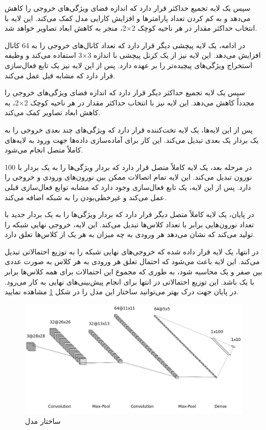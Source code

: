 سپس یک لایه تجمیع حداکثر%
قرار دارد که اندازه فضای ویژگی‌های خروجی را کاهش می‌دهد و به کم کردن تعداد پارامترها و افزایش کارایی مدل کمک می‌کند. این لایه با انتخاب حداکثر مقدار در هر ناحیه کوچک
2$\times$2،
منجر به کاهش ابعاد تصاویر خواهد شد.

در ادامه، یک لایه پیچشی دیگر قرار دارد که تعداد کانال‌های خروجی را به 64 کانال افزایش می‌دهد. این لایه نیز از یک کرنل پیچشی با اندازه
3$\times$3
استفاده می‌کند و وظیفه استخراج ویژگی‌های پیچیده‌تر را بر عهده دارد. پس از این لایه نیز یک تابع فعال‌سازی
قرار دارد که مشابه قبل عمل می‌کند.

سپس یک لایه تجمیع حداکثر دیگر قرار دارد که اندازه فضای ویژگی‌های خروجی را مجدداً کاهش می‌دهد. این لایه نیز با انتخاب حداکثر مقدار در هر ناحیه کوچک
2$\times$2،
به کاهش ابعاد تصاویر کمک می‌کند.

پس از این لایه‌ها، یک لایه تخت‌کننده قرار دارد که ویژگی‌های چند بعدی خروجی را به یک بردار یک بعدی تبدیل می‌کند. این کار برای آماده‌سازی داده‌ها جهت ورود به لایه‌های کاملاً متصل انجام می‌شود.

در مرحله بعد، یک لایه کاملاً متصل قرار دارد که بردار ویژگی‌ها را به یک بردار با 100 نورون تبدیل می‌کند. این لایه تمام اتصالات ممکن بین نورون‌های ورودی و خروجی را دارد. پس از این لایه، یک تابع فعال‌سازی
وجود دارد که مشابه توابع فعال‌سازی قبلی عمل می‌کند و غیرخطی‌بودن را به شبکه اضافه می‌کند.

در پایان، یک لایه کاملاً متصل دیگر قرار دارد که بردار ویژگی‌ها را به یک بردار جدید با تعداد نورون‌هایی برابر با تعداد کلاس‌ها تبدیل می‌کند. این لایه، خروجی نهایی شبکه را تولید می‌کند که نشان می‌دهد هر ورودی به چه میزان به هر یک از کلاس‌ها تعلق دارد.

در انتها، یک لایه
قرار داده شده که خروجی‌های نهایی شبکه را به توزیع احتمالاتی تبدیل می‌کند. این لایه باعث می‌شود که احتمال تعلق هر ورودی به هر کلاس به صورت عددی بین صفر و یک محاسبه شود، به طوری که مجموع این احتمالات برای همه کلاس‌ها برابر با یک باشد. این توزیع احتمالاتی در انتها برای انجام پیش‌بینی‌های نهایی به کار می‌رود. در پایان جهت درک بهتر می‌توانید ساختار این مدل را در شکل
\ref{cnn}
مشاهده نمایید.


\begin{figure}[t]
	\centering
	\includegraphics[scale=0.47]{images/chap5/cnn.png}%
	\caption{
		ساختار مدل 
	}
	\label{cnn}
	\centering
\end{figure}




